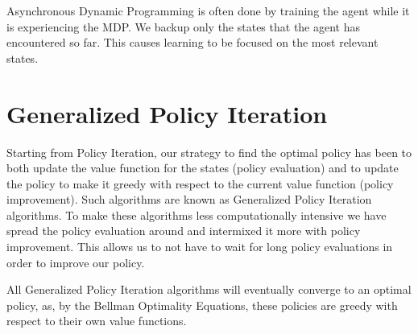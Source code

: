 \documentclass[12pt]{report}
\begin{document}
Asynchronous Dynamic Programming is often done by training the agent while it is experiencing the MDP. We backup only the states that the agent has encountered so far. This causes learning to be focused on the most relevant states.
\section{Generalized Policy Iteration}
Starting from Policy Iteration, our strategy to find the optimal policy has been to both update the value function for the states (policy evaluation) and to update the policy to make it greedy with respect to the current value function (policy improvement). Such algorithms are known as 
Generalized Policy Iteration algorithms. To make these algorithms less computationally intensive we have spread the policy evaluation around and intermixed it more with policy improvement. This allows us to not have to wait for long policy evaluations in order to improve our policy.

All Generalized Policy Iteration algorithms will eventually converge to an optimal policy, as, by the Bellman Optimality Equations, these policies are greedy with respect to their own value functions.
\end{document}

